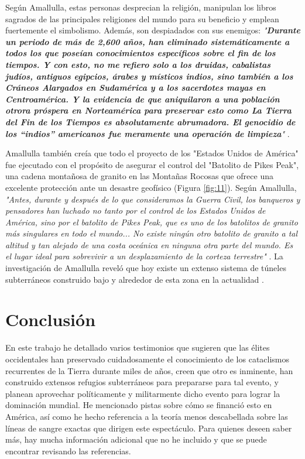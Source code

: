 \documentclass[10pt,twocolumn,letterpaper]{article}
\begin{document}
Según Amallulla, estas personas desprecian la religión, manipulan los libros sagrados de las principales religiones del mundo para su beneficio y emplean fuertemente el simbolismo. Además, son despiadados con sus enemigos: \textit{"\textbf{Durante un periodo de más de 2,600 años, han eliminado sistemáticamente a todos los que poseían conocimientos específicos sobre el fin de los tiempos. Y con esto, no me refiero solo a los druidas, cabalistas judíos, antiguos egipcios, árabes y místicos indios, sino también a los Cráneos Alargados en Sudamérica y a los sacerdotes mayas en Centroamérica. Y la evidencia de que aniquilaron a una población otrora próspera en Norteamérica para preservar esto como La Tierra del Fin de los Tiempos es absolutamente abrumadora. El genocidio de los “indios” americanos fue meramente una operación de limpieza}"} \cite{33,34}.

Amallulla también creía que todo el proyecto de los "Estados Unidos de América" fue ejecutado con el propósito de asegurar el control del "Batolito de Pikes Peak", una cadena montañosa de granito en las Montañas Rocosas que ofrece una excelente protección ante un desastre geofísico (Figura \ref{fig:11}). Según Amallulla, \textit{"Antes, durante y después de lo que consideramos la Guerra Civil, los banqueros y pensadores han luchado no tanto por el control de los Estados Unidos de América, sino por el batolito de Pikes Peak, que es uno de los batolitos de granito más singulares en todo el mundo... No existe ningún otro batolito de granito a tal altitud y tan alejado de una costa oceánica en ninguna otra parte del mundo. Es el lugar ideal para sobrevivir a un desplazamiento de la corteza terrestre"} \cite{33,34}. La investigación de Amallulla reveló que hoy existe un extenso sistema de túneles subterráneos construido bajo y alrededor de esta zona en la actualidad \cite{36}.

\section{Conclusión}

En este trabajo he detallado varios testimonios que sugieren que las élites occidentales han preservado cuidadosamente el conocimiento de los cataclismos recurrentes de la Tierra durante miles de años, creen que otro es inminente, han construido extensos refugios subterráneos para prepararse para tal evento, y planean aprovechar políticamente y militarmente dicho evento para lograr la dominación mundial. He mencionado pistas sobre cómo se financió esto en América, así como he hecho referencia a la teoría menos descabellada sobre las líneas de sangre exactas que dirigen este espectáculo. Para quienes deseen saber más, hay mucha información adicional que no he incluido y que se puede encontrar revisando las referencias.
\end{document}
